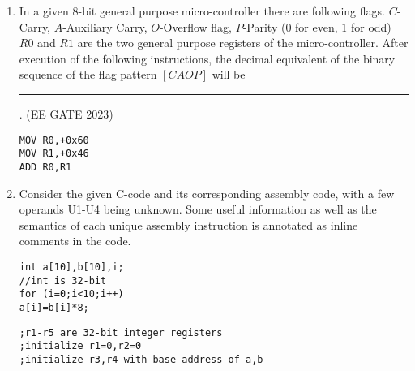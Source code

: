 \begin{enumerate}[label=\arabic*.,ref=\theenumi]
\item In a given $8$-bit general purpose micro-controller there are following flags. $C$-Carry, $A$-Auxiliary Carry, $O$-Overflow flag, $P$-Parity ($0$ for even, $1$ for odd) $R0$ and $R1$ are the two general purpose registers of the micro-controller. After execution of the following instructions, the decimal equivalent of the binary sequence of the flag pattern $[CAOP]$ will be \rule{1cm}{0.1pt}.
\hfill{(EE GATE 2023)}
\begin{lstlisting}
MOV R0,+0x60
MOV R1,+0x46 
ADD R0,R1
\end{lstlisting}
\item 
Consider the given C-code and its corresponding assembly code, with a few operands U1-U4 being unknown. Some useful information as well as the semantics of each unique assembly instruction is annotated as inline comments in the code.
\begin{lstlisting}
int a[10],b[10],i;
//int is 32-bit
for (i=0;i<10;i++)
a[i]=b[i]*8;
\end{lstlisting}
%
\begin{lstlisting}
;r1-r5 are 32-bit integer registers
;initialize r1=0,r2=0
;initialize r3,r4 with base address of a,b


\end{lstlisting}
\end{enumerate}
